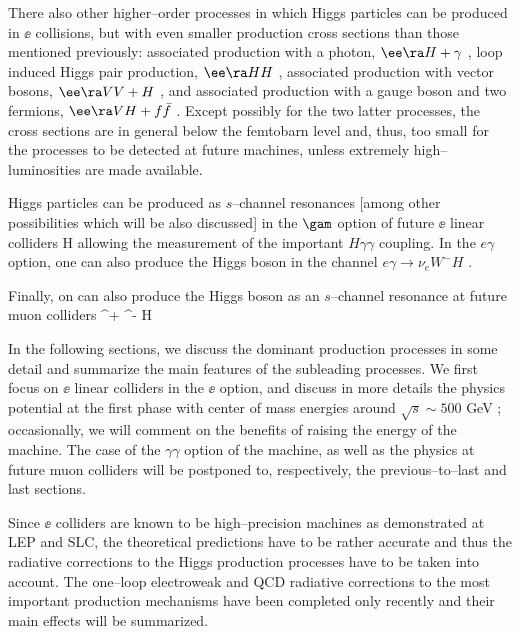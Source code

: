 There also other higher--order processes in which Higgs particles can be
produced in $\ee$ collisions, but with even smaller production cross sections
than those mentioned previously: associated production with a photon, $\ee \ra
H+ \gamma$ \cite{ee-Hgamma}, loop induced Higgs pair production, $\ee \ra
HH$ \cite{ee-HHloop}, associated production with vector bosons, $\ee \ra
VV + H$ \cite{ee-HVff,ee-HVV}, and associated production with a gauge boson 
and two fermions, $\ee \ra VH + f\bar{f}$ \cite{ee-HVff}. Except possibly for 
the two latter processes, the cross sections are in general below the femtobarn 
level and, thus, too small for the processes to be detected at future machines, 
unless extremely high--luminosities are made available. \s

Higgs particles can be produced as $s$--channel resonances 
\cite{gamma-Rev-old,BBC}
[among other possibilities  which will be also discussed] in the 
$\gam$ option of future $\ee$ linear colliders 
\beq
\gamma \gamma \lra H 
\eeq
allowing the measurement of the important $H \gamma \gamma$ coupling. In the 
$e \gamma$ option, one can also produce the Higgs boson in the channel
$e \gamma \to \nu_e W^- H$ \cite{egamma-H}. \s

Finally,  on can also produce the Higgs boson as an $s$--channel resonance at 
future muon colliders \cite{mu-Rev1,mu-schannel}
\beq
\mu^+ \mu^- \lra H
\eeq

In the following sections, we discuss the dominant production processes in some
detail and summarize the main features of the subleading processes.  We first
focus on $\ee$ linear colliders in the  $\ee$ option, and discuss in more
details the physics potential at the first phase with center of mass energies
around $\sqrt{s} \sim 500$ GeV \cite{ee-Review-old,ee-Review-DESY};
occasionally, we will comment on the benefits of raising the energy of the
machine. The case of the $\gamma \gamma$ option of the machine, as well as the
physics at future muon colliders will be postponed to, respectively, the
previous--to--last and last sections.\s 

Since $\ee$ colliders are known to be high--precision machines as
demonstrated at LEP and SLC, the theoretical predictions have to be rather
accurate and thus the radiative corrections to the Higgs production  
processes have to be taken into account. The one--loop electroweak and QCD 
radiative corrections to the most important production mechanisms have been 
completed only recently 
\cite{RCHZ,RCWW1,RCWW2,RCWW3,RCZZ,RCTTqcd1,RCTTqcd2,RCTTew1,RCTTew2,RCTTew0,RCZHH1,RCZHH2,RCWWHH} and their main effects will be summarized.\s

